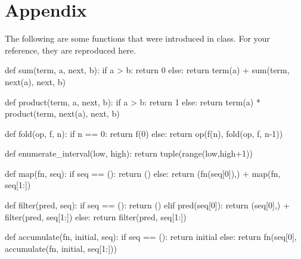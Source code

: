 \newpage
\section{Appendix}
The following are some functions that were introduced in class. For your reference, they are
reproduced here.
\begin{python}
def sum(term, a, next, b):
    if a > b:
        return 0
    else:
    return term(a) + sum(term, next(a), next, b)

def product(term, a, next, b):
    if a > b:
        return 1
    else:
        return term(a) * product(term, next(a), next, b)

def fold(op, f, n):
    if n == 0:
        return f(0)
    else:
        return op(f(n), fold(op, f, n-1))

def enumerate_interval(low, high):
    return tuple(range(low,high+1))

def map(fn, seq):
    if seq == ():
        return ()
    else:
        return (fn(seq[0]),) + map(fn, seq[1:])

def filter(pred, seq):
    if seq == ():
        return ()
    elif pred(seq[0]):
        return (seq[0],) + filter(pred, seq[1:])
    else:
        return filter(pred, seq[1:])

def accumulate(fn, initial, seq):
    if seq == ():
        return initial
    else:
        return fn(seq[0], accumulate(fn, initial, seq[1:]))
\end{python}

